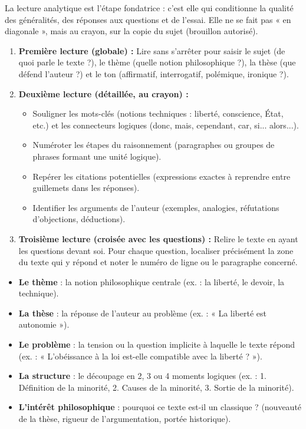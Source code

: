 \documentclass[11pt]{article}
\newcommand{\cle}[1]{{\popxbold\color{popdark}#1}}
\newcounter{popsec}
\newcounter{popsub}
\newcommand{\courssub}[1]{%
  \stepcounter{popsub}%
  \par\vspace{9pt}\noindent{\popxbold\fontsize{11.5}{13}\selectfont\color{popink}{\color{poporange}\thepopsec.\thepopsub}\hspace{6pt}#1}\par\nopagebreak\vspace{4pt}
}
\begin{document}
\courssub{La lecture analytique du texte}

La lecture analytique est l'étape fondatrice : c'est elle qui conditionne la qualité des généralités, des réponses aux questions et de l'essai. Elle ne se fait pas « en diagonale », mais au crayon, sur la copie du sujet (brouillon autorisé).

\begin{methode}
\begin{enumerate}
\item \textbf{Première lecture (globale) :} Lire sans s'arrêter pour saisir le \cle{sujet} (de quoi parle le texte ?), le \cle{thème} (quelle notion philosophique ?), la \cle{thèse} (que défend l'auteur ?) et le \cle{ton} (affirmatif, interrogatif, polémique, ironique ?).
\item \textbf{Deuxième lecture (détaillée, au crayon) :}
      \begin{itemize}
      \item Souligner les \cle{mots-clés} (notions techniques : liberté, conscience, État, etc.) et les \cle{connecteurs logiques} (donc, mais, cependant, car, si... alors...).
      \item Numéroter les \cle{étapes du raisonnement} (paragraphes ou groupes de phrases formant une unité logique).
      \item Repérer les \cle{citations} potentielles (expressions exactes à reprendre entre guillemets dans les réponses).
      \item Identifier les \cle{arguments} de l'auteur (exemples, analogies, réfutations d'objections, déductions).
      \end{itemize}
\item \textbf{Troisième lecture (croisée avec les questions) :} Relire le texte en ayant les questions devant soi. Pour chaque question, localiser précisément la zone du texte qui y répond et noter le numéro de ligne ou le paragraphe concerné.
\end{enumerate}
\end{methode}

\begin{aretenir}
\begin{itemize}
\item \textbf{Le thème} : la notion philosophique centrale (ex. : la liberté, le devoir, la technique).
\item \textbf{La thèse} : la réponse de l'auteur au problème (ex. : « La liberté est autonomie »).
\item \textbf{Le problème} : la tension ou la question implicite à laquelle le texte répond (ex. : « L'obéissance à la loi est-elle compatible avec la liberté ? »).
\item \textbf{La structure} : le découpage en 2, 3 ou 4 moments logiques (ex. : 1. Définition de la minorité, 2. Causes de la minorité, 3. Sortie de la minorité).
\item \textbf{L'intérêt philosophique} : pourquoi ce texte est-il un classique ? (nouveauté de la thèse, rigueur de l'argumentation, portée historique).
\end{itemize}
\end{aretenir}
\end{document}

